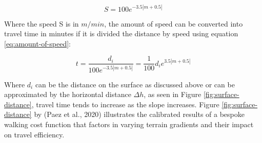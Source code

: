\documentclass[
11pt, %
oneside, %
english, %
singlespacing, %
]{macthesis} %
\begin{document}
\begin{equation}
S = 100 e^{-3.5 |m + 0.5|}
\label{eq:slope-linked-to-speed-via-formula}
\end{equation}

Where the speed S is in \(m/min\), the amount of speed can be converted into travel time in minutes if it is divided the distance by speed using equation \eqref{eq:amount-of-speed}:

\begin{equation}
t = \frac{d_i}{100 e^{-3.5 |m + 0.5|}} = \frac{1}{100} d_i e^{3.5 |m + 0.5|}
\label{eq:amount-of-speed}
\end{equation}

Where \(d_i\) can be the distance on the surface as discussed above or can be approximated by the horizontal distance \(\Delta h\), as seen in Figure \ref{fig:surface-distance}, travel time tends to increase as the slope increases. Figure \ref{fig:surface-distance} by (Paez et al., 2020) illustrates the calibrated results of a bespoke walking cost function that factors in varying terrain gradients and their impact on travel efficiency.
\end{document}
